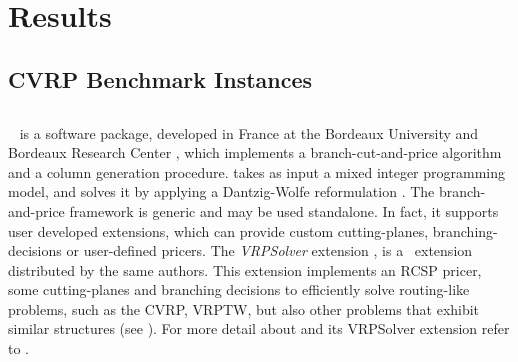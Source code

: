 \chapter{Results}
\label{sec:results}

\section{CVRP Benchmark Instances}
\label{sec:results-benchmark-instances}





\begin{comment}
\cite{uchoa2017}
THE CVRPLIB website
The typical instance repository of today is a web page that allows downloading the instance
files and includes additional textual information, like file format description, instance
source, best known/optimal solution values, etc. The CVRLIB web page, where the new
instances (and all the previous CVRP instances described in Section 2) are available
(http://vrp.galgos.inf.puc-rio.br/index.php/en/), is more sophisticated:
\end{comment}


\section{\bapcod}
\label{sec:results-bapcod}

\textit{\bapcod}\ \parencite{sadykov2021} is a software package,
developed in France at the Bordeaux University and Bordeaux Research Center ,
which implements a branch-cut-and-price algorithm
and a column generation procedure.
\bapcod takes as input a mixed integer programming model, and solves it by applying
a Dantzig-Wolfe reformulation \parencite{dantzig1960}.
The branch-and-price framework is generic and may be used standalone.
In fact, it supports user developed extensions,
which can provide custom cutting-planes, branching-decisions
or user-defined pricers.
The \textit{VRPSolver} extension \parencite{pessoa2020a}, is
a \bapcod\ extension distributed by the same authors.
This extension implements an RCSP pricer, some cutting-planes
and branching decisions to efficiently solve routing-like problems,
such as the CVRP, VRPTW, but also other problems that exhibit similar
structures (see \cite{pessoa2020a}).
For more detail about \bapcod and its VRPSolver extension refer to
\textcite{sadykov2021}.

